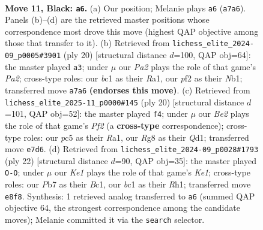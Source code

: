 \documentclass[11pt]{article}
\begin{document}
\clearpage

\begin{figure}[p]\centering
\begin{subfigure}{0.46\textwidth}\centering
\resizebox{\linewidth}{!}{%
\newchessgame
\chessboard[
  setfen={rnb1k1r1/pp1qbp1p/4p1p1/2Pp3n/3P4/2N5/PP1N1PPP/1RBQKB1R b q - 3 11},
  showmover=false,
  pgfstyle=straightmove, color=movearrow, markmove={a7-a6}
]}
\caption{}
\end{subfigure}\hfill
\begin{subfigure}{0.46\textwidth}\centering
\resizebox{\linewidth}{!}{%
\newchessgame
\chessboard[
  setfen={r1bqkb1r/3n1ppp/p1n1p3/3pP3/1P1p1P2/1P3N2/PB2Q1PP/RN2KB1R w KQkq - 0 11},
  showmover=false,
  pgfstyle=straightmove, color=movearrow, markmove={a2-a3}
]}
\caption{}
\end{subfigure}
\\[4pt]
\begin{subfigure}{0.46\textwidth}\centering
\resizebox{\linewidth}{!}{%
\newchessgame
\chessboard[
  setfen={r1bqkb1r/3n1ppp/pn1pp3/1p4P1/3NP2P/P1N1B3/1PP2P2/R2QKB1R w KQkq - 3 11},
  showmover=false,
  pgfstyle=straightmove, color=movearrow, markmove={f2-f4}
]}
\caption{}
\end{subfigure}\hfill
\begin{subfigure}{0.46\textwidth}\centering
\resizebox{\linewidth}{!}{%
\newchessgame
\chessboard[
  setfen={rn1q1rk1/pp1b1pb1/3p1npp/2pP4/2P5/2NB1N1P/PP3PP1/R1BQK2R w KQ - 1 12},
  showmover=false,
  pgfstyle=straightmove, color=movearrow, markmove={e1-g1}
]}
\caption{}
\end{subfigure}
\caption{\textbf{Move 11, Black: \texttt{a6}.} (a) Our position; Melanie plays \texttt{a6} (\texttt{a7a6}). Panels (b)--(d) are the retrieved master positions whose correspondence most drove this move (highest QAP objective among those that transfer to it). (b) Retrieved from \texttt{lichess\_elite\_2024-09\_p0005\#3901} (ply 20) [structural distance $d$=100, QAP obj=64]: the master played \texttt{a3}; under $\mu$ our \emph{Pa2} plays the role of that game's \emph{Pa2}; cross-type roles: our \emph{b}c1 as their \emph{R}a1, our \emph{p}f2 as their \emph{N}b1; transferred move \texttt{a7a6} \textbf{(endorses this move)}. (c) Retrieved from \texttt{lichess\_elite\_2025-11\_p0000\#145} (ply 20) [structural distance $d$=101, QAP obj=52]: the master played \texttt{f4}; under $\mu$ our \emph{Be2} plays the role of that game's \emph{Pf2} (a \textbf{cross-type} correspondence); cross-type roles: our \emph{p}c5 as their \emph{R}a1, our \emph{R}g8 as their \emph{Q}d1; transferred move \texttt{e7d6}. (d) Retrieved from \texttt{lichess\_elite\_2024-09\_p0028\#1793} (ply 22) [structural distance $d$=90, QAP obj=35]: the master played \texttt{O-O}; under $\mu$ our \emph{Ke1} plays the role of that game's \emph{Ke1}; cross-type roles: our \emph{P}b7 as their \emph{B}c1, our \emph{b}c1 as their \emph{R}h1; transferred move \texttt{e8f8}. Synthesis: 1 retrieved analog transferred to \texttt{a6} (summed QAP objective 64, the strongest correspondence among the candidate moves); Melanie committed it via the \texttt{search} selector.}
\label{fig:thought-m21}
\end{figure}
\end{document}

